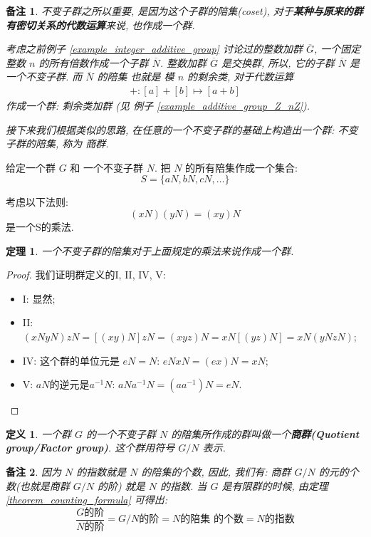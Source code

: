 \documentclass[utf8]{ctexbook}
\newtheorem{theorem}{定理}[section]
\newtheorem{definition}{定义}[section]
\newtheorem{memo}{备注}[section]
\begin{document}
\begin{memo}
不变子群之所以重要, 是因为这个子群的陪集(coset), 对于\textbf{某种与原来的群有密切关系的代数运算}来说, 也作成一个群.

考虑之前例子 \ref{example_integer_additive_group} 讨论过的整数加群 $\overline{G}$, 一个固定整数 $n$ 的所有倍数作成一个子群 $\overline{N}$. 整数加群 $\overline{G}$ 是交换群, 所以, 它的子群 $\overline{N}$ 是一个不变子群. 而 $\overline{N}$ 的陪集 也就是 模 $n$ 的剩余类, 对于代数运算
\begin{align*}
+ : [a] + [b] \mapsto [a+b]
\end{align*}
作成一个群: 剩余类加群 (见 例子 \ref{example_additive_group_Z_nZ}).

接下来我们根据类似的思路, 在任意的一个不变子群的基础上构造出一个群: 不变子群的陪集, 称为 商群.
\end{memo}

给定一个群 $G$ 和 一个不变子群 $N$. 把 $N$ 的所有陪集作成一个集合:
$$ S = \{ aN, bN, cN, \ldots \}$$

考虑以下法则:
$$ (xN) (yN) = (xy) N $$
是一个S的乘法.

\begin{theorem}
一个不变子群的陪集对于上面规定的乘法来说作成一个群.

\end{theorem}

\begin{proof}
我们证明群定义的I, II, IV, V:
\begin{itemize}
\item{I: 显然;}
\item{II: $ (x N y N) z N = [ (xy) N ] z N = (xyz) N  = x N [(yz) N] = x N ( y N z N)$;}
\item{IV: 这个群的单位元是 $eN =N$: $e N x N = (ex)N = x N$;}
\item{V: $aN$的逆元是$a^{-1}N$: $a N a^{-1} N = (a a^{-1}) N = e N$.}
\end{itemize}

\end{proof}

\begin{definition}
一个群 $G$ 的一个不变子群 $N$ 的陪集所作成的群叫做一个\textbf{商群(Quotient group/Factor group)}. 这个群用符号 $G/N$ 表示.
\end{definition}

\begin{memo}
因为 $N$ 的指数就是 $N$ 的陪集的个数, 因此, 我们有: 商群 $G/N$ 的元的个数(也就是商群 $G/N$ 的阶) 就是 $N$ 的指数. 当 $G$ 是有限群的时候, 由定理 \ref{theorem_counting_formula} 可得出:
\begin{equation*}
\frac{G\mbox{的阶}}{N\mbox{的阶}} = G/N \mbox{的阶} = N \mbox{的陪集 的个数} = N \mbox{的指数} 
\end{equation*} 
\end{memo}
\end{document}
